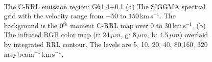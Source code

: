 \documentclass[manuscript]{aastex61}
\newcommand{\kms}{\,km\,s$^{-1}$}
\newcommand{\um}{\mu m}
\begin{document}
\begin{figure}[H]
	\centering
	\\
	\caption{The C-RRL emission region: G61.4+0.1
	(a) The SIGGMA spectral grid with the velocity range from $-50$ to $150$\kms.
	The background is the 0$^{th}$ moment C-RRL map over $0$ to $30$\kms.
	(b) The infrared RGB color map (r: 24\,$\um$, g: 8\,$\um$, b: 4.5\,$\um$) overlaid by integrated RRL contour.
	The levels are 5, 10, 20, 40, 80,160, 320 mJy\,beam$^{-1}$\kms.}
	\label{fig_crrl-g614}
\end{figure}
\end{document}
